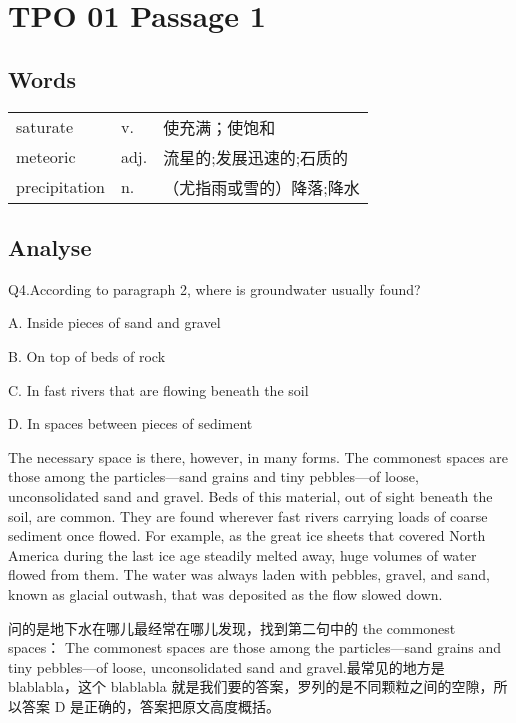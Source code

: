 \section{TPO 01 Passage 1}

\subsection{Words}

\begin{tabular}{lll}

    saturate      & v.   & 使充满；使饱和       \\
    meteoric      & adj. & 流星的;发展迅速的;石质的 \\
    precipitation & n.   & （尤指雨或雪的）降落;降水 \\
\end{tabular}

\subsection{Analyse}

\begin{blk}
    \begin{qst}
        Q4.According to paragraph 2, where is groundwater usually found?
    \end{qst}

    \begin{chc}
        A. Inside pieces of sand and gravel

        B. On top of beds of rock

        C. In fast rivers that are flowing beneath the soil

        D. In spaces between pieces of sediment
    \end{chc}

    \begin{psgq}
        The necessary space is there, however, in many forms. The commonest spaces are those among the particles—sand grains and tiny pebbles—of loose, unconsolidated sand and gravel. Beds of this material, out of sight beneath the soil, are common. They are found wherever fast rivers carrying loads of coarse sediment once flowed. For example, as the great ice sheets that covered North America during the last ice age steadily melted away, huge volumes of water flowed from them. The water was always laden with pebbles, gravel, and sand, known as glacial outwash, that was deposited as the flow slowed down.
    \end{psgq}

    \begin{nlz}
        问的是地下水在哪儿最经常在哪儿发现，找到第二句中的 the commonest spaces： The commonest spaces are those among the particles—sand grains and tiny pebbles—of loose, unconsolidated sand and gravel.最常见的地方是 blablabla，这个 blablabla 就是我们要的答案，罗列的是不同颗粒之间的空隙，所以答案 D 是正确的，答案把原文高度概括。
    \end{nlz}
\end{blk}

